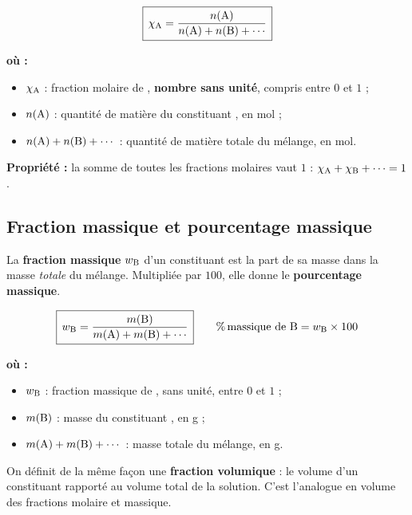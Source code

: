 \documentclass[11pt,a4paper]{article}
\newenvironment{ou}{%
  \par\smallskip\noindent\textbf{où :}\nopagebreak
  \begin{itemize}[leftmargin=1.8em,topsep=2pt,itemsep=1.5pt,parsep=0pt]}%
  {\end{itemize}}
\begin{document}
\begin{formule}
\[ \boxed{\,\chi_{\ce{A}} = \dfrac{n(\ce{A})}{n(\ce{A}) + n(\ce{B}) + \cdots}\,} \]
\begin{ou}
  \item $\chi_{\ce{A}}$ : fraction molaire de , \textbf{nombre sans unité}, compris entre $0$ et $1$ ;
  \item $n(\ce{A})$ : quantité de matière du constituant , en \si{\mole} ;
  \item $n(\ce{A})+n(\ce{B})+\cdots$ : quantité de matière totale du mélange, en \si{\mole}.
\end{ou}
\textbf{Propriété :} la somme de toutes les fractions molaires vaut $1$ : $\chi_{\ce{A}}+\chi_{\ce{B}}+\cdots = 1$.
\end{formule}

\subsection{Fraction massique et pourcentage massique}

\begin{definition}
La \textbf{fraction massique} $w_{\ce{B}}$ d'un constituant  est la part de sa masse dans la
masse \emph{totale} du mélange. Multipliée par $100$, elle donne le \textbf{pourcentage massique}.
\end{definition}

\begin{formule}
\[ \boxed{\,w_{\ce{B}} = \dfrac{m(\ce{B})}{m(\ce{A}) + m(\ce{B}) + \cdots}\,}\qquad
   \%\,\text{massique de \ce{B}} = w_{\ce{B}}\times 100 \]
\begin{ou}
  \item $w_{\ce{B}}$ : fraction massique de , sans unité, entre $0$ et $1$ ;
  \item $m(\ce{B})$ : masse du constituant , en \si{\gram} ;
  \item $m(\ce{A})+m(\ce{B})+\cdots$ : masse totale du mélange, en \si{\gram}.
\end{ou}
\end{formule}

\begin{remarque}
On définit de la même façon une \textbf{fraction volumique} : le volume d'un constituant rapporté au
volume total de la solution. C'est l'analogue \og en volume \fg{} des fractions molaire et massique.
\end{remarque}
\end{document}
